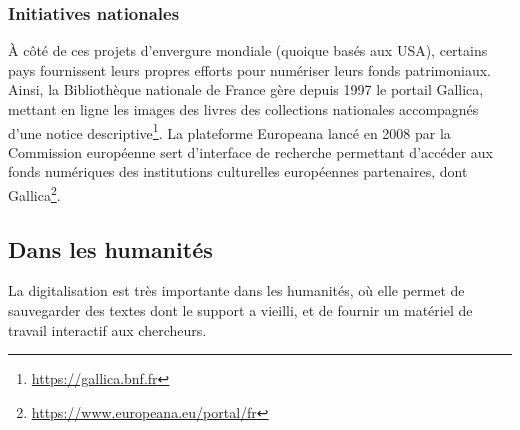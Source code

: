 \subsubsection{Initiatives nationales}
À côté de ces projets d'envergure mondiale (quoique basés aux USA), certains pays fournissent leurs propres efforts pour numériser leurs fonds patrimoniaux.
Ainsi, la Bibliothèque nationale de France gère depuis 1997 le portail Gallica, mettant en ligne les images des livres des collections nationales accompagnés d'une notice descriptive\footnote{\url{https://gallica.bnf.fr}}.
La plateforme Europeana lancé en 2008 par la Commission européenne sert d'interface de recherche permettant d'accéder aux fonds numériques des institutions culturelles européennes partenaires, dont Gallica\footnote{\url{https://www.europeana.eu/portal/fr}}.
\subsection{Dans les humanités}
La digitalisation est très importante dans les humanités, où elle permet de sauvegarder des textes dont le support a vieilli, et de fournir un matériel de travail interactif aux chercheurs.
